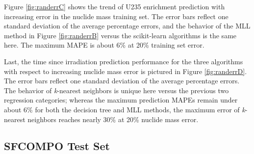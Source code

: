 Figure \ref{fig:randerrC} shows the trend of \gls{U235} enrichment prediction
with increasing error in the nuclide mass training set.  The error bars reflect
one standard deviation of the average percentage errors, and the behavior of
the \gls{MLL} method in Figure \ref{fig:randerrB} versus the scikit-learn
algorithms is the same here.  The maximum \gls{MAPE} is about 6\% at 20\%
training set error. 

Last, the time since irradiation prediction performance for the three
algorithms with respect to increasing nuclide mass error is pictured in Figure
\ref{fig:randerrD}.  The error bars reflect one standard deviation of the
average percentage errors.  The behavior of \textit{k}-nearest neighbors is
unique here versus the previous two regression categories; whereas the maximum
prediction \gls{MAPE}s remain under about 6\% for both the decision tree and
\gls{MLL} methods, the maximum error of \textit{k}-nearest neighbors reaches
nearly 30\% at 20\% nuclide mass error.  



\subsection{SFCOMPO Test Set}
\label{sec:sfcompo}

